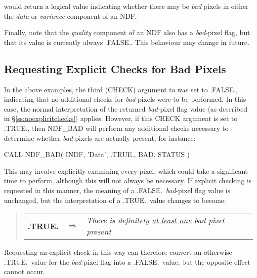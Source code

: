 \documentclass[twoside,11pt,nolof]{starlink}
\providecommand{\st}[1]{{\emph{#1}}}
\begin{document}
would return a logical value indicating whether there may be \st{bad\/}
pixels in either the \st{data\/} or \st{variance\/} component of an NDF.

Finally, note that the \st{quality\/} component of an NDF also has a
\st{bad\/}-pixel flag, but that its value is currently always .FALSE..
This behaviour may change in future.

\subsection{\label{ss:badpixelabort}\label{ss:explicitchecks}Requesting Explicit Checks for Bad Pixels}

In the above examples, the third (CHECK) argument to  was set to
.FALSE., indicating that no additional checks for \st{bad\/} pixels were to
be performed.
In this case, the normal interpretation of the returned \st{bad\/}-pixel flag
value (as described in \S\ref{ss:noexplicitchecks}) applies.
However, if this CHECK argument is set to .TRUE., then NDF\_BAD will perform
any additional checks necessary to determine whether \st{bad\/} pixels are
actually present, for instance:

\small
\begin{terminalv}
      CALL NDF_BAD( INDF, 'Data', .TRUE., BAD, STATUS )
\end{terminalv}
\normalsize

This may involve explicitly examining every pixel, which could take a
significant time to perform, although this will not always be necessary.
If explicit checking is requested in this manner, the meaning of a
.FALSE.\ \st{bad\/}-pixel flag value is unchanged, but the
interpretation of a .TRUE.\ value changes to become:

\small
\begin{quote}
\begin{center}
\begin{tabular}{rcl}
\textbf{.TRUE.} & $\Rightarrow$ & \st{There is definitely \underline{at least one}
bad pixel present}
\end{tabular}
\end{center}
\end{quote}
\normalsize

Requesting an explicit check in this way can therefore convert an otherwise
.TRUE.\ value for the \st{bad\/}-pixel flag into a .FALSE.\ value, but the
opposite effect cannot occur.
\end{document}
